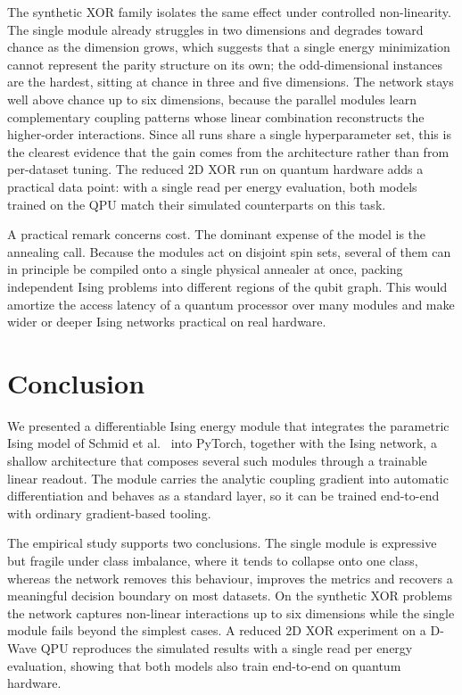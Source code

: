 \documentclass{ieeeaccess}
\begin{document}
The synthetic XOR family isolates the same effect under controlled
non-linearity. The single module already struggles in two dimensions and
degrades toward chance as the dimension grows, which suggests that a single
energy minimization cannot represent the parity structure on its own; the
odd-dimensional instances are the hardest, sitting at chance in three and five
dimensions.
The network stays well above chance up to six dimensions, because
the parallel modules learn complementary coupling patterns whose linear
combination reconstructs the higher-order interactions. Since all runs share a
single hyperparameter set, this is the clearest evidence that the gain comes
from the architecture rather than from per-dataset tuning. The reduced 2D XOR
run on quantum hardware adds a practical data point: with a single read per
energy evaluation, both models trained on the QPU match their simulated
counterparts on this task.

A practical remark concerns cost. The dominant expense of the model is the
annealing call. Because the modules act on disjoint spin sets, several of them
can in principle be compiled onto a single physical annealer at once, packing
independent Ising problems into different regions of the qubit graph. This
would amortize the access latency of a quantum processor over many modules and
make wider or deeper Ising networks practical on real hardware.

\section{Conclusion}\label{sec:conclusion}

We presented a differentiable Ising energy module that integrates the
parametric Ising model of Schmid et al.~\cite{10.21468/SciPostPhysCore.7.1.013}
into PyTorch, together with the Ising network, a shallow architecture that
composes several such modules through a trainable linear readout. The module
carries the analytic coupling gradient into automatic differentiation and
behaves as a standard layer, so it can be trained end-to-end with ordinary
gradient-based tooling.

The empirical study supports two conclusions. The single module is expressive
but fragile under class imbalance, where it tends to collapse onto one class,
whereas the network removes this behaviour, improves the metrics and recovers
a meaningful decision boundary on most datasets. On the synthetic XOR problems
the network captures non-linear interactions up to six dimensions while the
single module fails beyond the simplest cases. A reduced 2D XOR experiment on
a D-Wave QPU reproduces the simulated results with a single read per energy
evaluation, showing that both models also train end-to-end on quantum
hardware.
\end{document}
